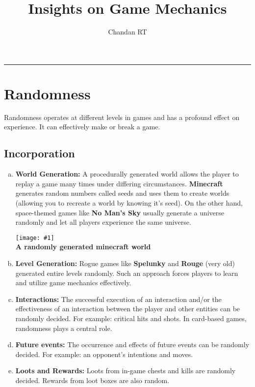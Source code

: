 \documentclass[12pt]{article}
\newcommand{\point}[1]{\item \textbf{#1:}}
\newcommand{\fig}[3]{\begin{center} \texttt{[image: \#1]}\\ \textbf{#3} \end{center}}
\begin{document}
\title{\textbf{Insights on Game Mechanics}}
\author{Chandan RT}
\date{}
\maketitle
\hrule

\tableofcontents

\newpage

\section{Randomness}

Randomness operates at different levels in games and has a profound effect on experience. It can effectively make or break a game.

\subsection{Incorporation}

\begin{enumerate}[a)]

\point{World Generation} A procedurally generated world allows the player to replay a game many times under differing circumstances. \textbf{Minecraft} generates random numbers called seeds and uses them to create worlds (allowing you to recreate a world by knowing it's seed). On the other hand, space-themed games like \textbf{No Man's Sky} usually generate a universe randomly and let all players experience the same universe.

\fig{minecraft_world.png}{0.5}{A randomly generated minecraft world}

\point{Level Generation} Rogue games like \textbf{Spelunky} and \textbf{Rouge} (very old) generated entire levels randomly. Such an approach forces players to learn and utilize game mechanics effectively.

\point{Interactions} The successful execution of an interaction and/or the effectiveness of an interaction between the player and other entities can be randomly decided. For example: critical hits and shots. In card-based games, randomness plays a central role.

\point{Future events} The occurrence and effects of future events can be randomly decided. For example: an opponent's intentions and moves.

\point{Loots and Rewards} Loots from in-game chests and kills are randomly decided. Rewards from loot boxes are also random.

\end{enumerate}
\end{document}
